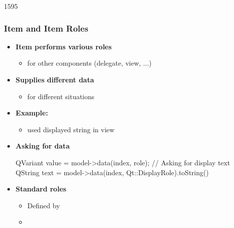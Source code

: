 \begin{slide}[fragile]{1595}\frametitle{Item and Item Roles}
  \begin{itemize}
  \item \textbf{Item performs various roles}
    \begin{itemize}
    \item for other components (delegate, view, ...)
    \end{itemize}
  \item \textbf{Supplies different data}
    \begin{itemize}
    \item for different situations
    \end{itemize}
  \item \textbf{Example:}
    \begin{itemize}
    \item {} used displayed string in view
    \end{itemize}
  \item \textbf{Asking for data}
    \begin{cpp}
QVariant value = model->data(index, role);      
// Asking for display text
QString text = model->data(index, Qt::DisplayRole).toString()        
    \end{cpp}
  \item \textbf{Standard roles}
    \begin{itemize}
    \item Defined by 
    \item {}
    \end{itemize}
  \end{itemize}
\end{slide}

